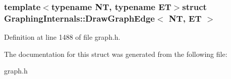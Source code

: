 \subsubsection*{template$<$typename N\+T, typename E\+T$>$struct Graphing\+Internals\+::\+Draw\+Graph\+Edge$<$ N\+T, E\+T $>$}



Definition at line 1488 of file graph.\+h.



The documentation for this struct was generated from the following file\+:\begin{DoxyCompactItemize}
\item 
graph.\+h\end{DoxyCompactItemize}
